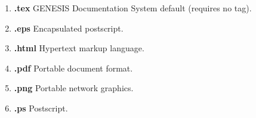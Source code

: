 \documentclass[12pt]{article}
\begin{document}
\begin{enumerate}

\item {\bf .tex} GENESIS Documentation System default (requires no tag).
\item {\bf .eps} Encapsulated postscript.
\item {\bf .html} Hypertext markup language.
\item {\bf .pdf} Portable document format.
\item {\bf .png} Portable network graphics.
\item {\bf .ps} Postscript.

\end{enumerate}
\end{document}
